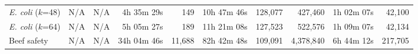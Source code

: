 \begin{table}
\begin{tabularx}{\textwidth}{@{}Yrrrrrrrrr@{}}
    \emph{E. coli} ($k$=48)         & N/A & N/A & 4h 35m 29s & 149 & 10h 47m 46s & 128,077 & 427,460 & 1h 02m 07s & 42,100 \\


    \emph{E. coli} ($k$=64)         & N/A & N/A & 5h 05m 27s & 189 & 11h 21m 08s & 127,523 & 522,576 & 1h 09m 07s & 42,134 \\

    Beef safety & N/A & N/A & 34h 04m 46s & 11,688 & 82h 42m 48s & 109,091 & 4,378,840 & 6h 44m 12s & 217,705 \\


\end{tabularx}
\end{table}
